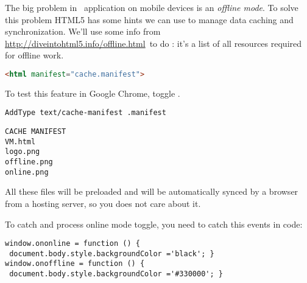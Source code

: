 \clearpage{}\label{lsoffline}

The big problem in \js\ application on mobile devices is an \emph{offline mode}.
To solve this problem HTML5 has some hints we can use to manage data caching and
synchronization. We'll use some info from
\url{http://diveintohtml5.info/offline.html}\ to do : it's a list
of all resources required for offline work.
\begin{lstlisting}[language=html]
<html manifest="cache.manifest">
\end{lstlisting}

\noindent To test this feature in Google Chrome, toggle
.

\clearpage
\begin{lstlisting}[title=.htaccess]
AddType text/cache-manifest .manifest
\end{lstlisting}
\begin{lstlisting}[title=cache.manifest]
CACHE MANIFEST
VM.html
logo.png
offline.png
online.png
\end{lstlisting}

\bigskip
\noindent All these files will be preloaded and will be automatically
synced by a browser from a hosting server, so you does not care about it.

\pg To catch and process online mode toggle, you need to catch this
events in code:
\begin{lstlisting}
window.ononline = function () {
 document.body.style.backgroundColor ='black'; }
window.onoffline = function () {
 document.body.style.backgroundColor ='#330000'; }
\end{lstlisting}
